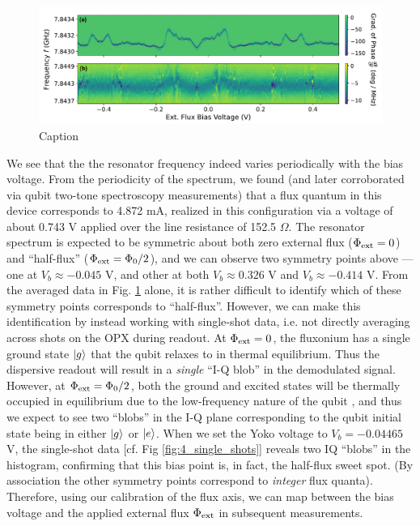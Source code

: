 \begin{figure}[h]
    \centering
    \includegraphics[width=\linewidth]{Figures/4/resonator_spectroscopy_vs_flux.pdf}
    \caption{Caption}
\label{fig:4_resonator_spectroscopy_vs_flux}
\end{figure}

We see that the the resonator frequency indeed varies periodically with the bias voltage. From the periodicity of the spectrum, we found (and later corroborated via qubit two-tone spectroscopy measurements) that a flux quantum in this device corresponds to 4.872 mA, realized in this configuration via a voltage of about 0.743 V applied over the line resistance of 152.5 $\Omega$. The resonator spectrum is expected to be symmetric about both zero external flux ($\Phi_{\rm ext} = 0$) and ``half-flux'' ($\Phi_{\rm ext} = \Phi_0/2$), and we can observe two symmetry points above --- one at $V_b \approx -0.045$ V, and other at both $V_b \approx 0.326$ V and $V_b \approx -0.414$ V. From the averaged data in Fig. \ref{fig:4_resonator_spectroscopy_vs_flux} alone, it is rather difficult to identify which of these symmetry points corresponds to ``half-flux''. However, we can make this identification by instead working with single-shot data, i.e. not directly averaging across shots on the OPX during readout. At $\Phi_{\rm ext} = 0$, the fluxonium has a single ground state $\lvert g\rangle$ that the qubit relaxes to in thermal equilibrium. Thus the dispersive readout will result in a \textit{single} ``I-Q blob'' in the demodulated signal. However, at $\Phi_{\rm ext} = \Phi_0/2$, both the ground and excited states will be thermally occupied in equilibrium due to the low-frequency nature of the qubit \cite{manenti2023quantum}, and thus we expect to see two ``blobs'' in the I-Q plane corresponding to the qubit initial state being in either $\lvert g\rangle$ or $\lvert e\rangle$. When we set the Yoko voltage to $V_b = -0.04465$ V, the single-shot data [cf. Fig \ref{fig:4_single_shots}] reveals two IQ ``blobs'' in the histogram, confirming that this bias point is, in fact, the half-flux sweet spot. (By association the other symmetry points correspond to \textit{integer} flux quanta). Therefore, using our calibration of the flux axis, we can map between the bias voltage and the applied external flux $\Phi_{\rm ext}$ in subsequent measurements. 

